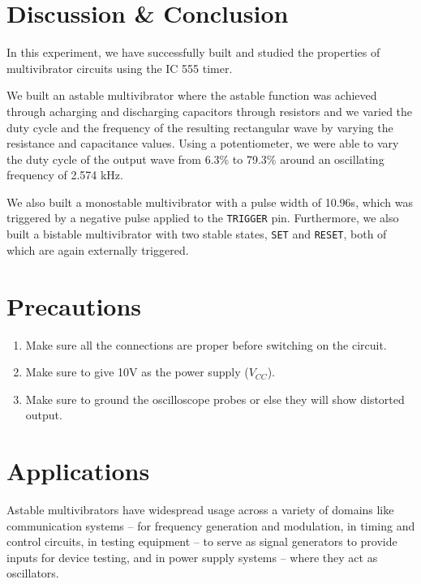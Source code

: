 \section{Discussion \& Conclusion}
In this experiment, we have successfully built and studied the properties of multivibrator circuits using the IC 555 timer.

We built an astable multivibrator where the astable function was achieved through acharging and discharging capacitors through resistors and we varied the duty cycle and the frequency of the resulting rectangular wave by varying the resistance and capacitance values.
Using a potentiometer, we were able to vary the duty cycle of the output wave from 6.3\% to 79.3\% around an oscillating frequency of 2.574 kHz.

We also built a monostable multivibrator with a pulse width of 10.96s, which was triggered by a negative pulse applied to the \verb|TRIGGER| pin. Furthermore, we also built a bistable multivibrator with two stable states, \verb|SET| and \verb|RESET|, both of which are again externally triggered.

\section{Precautions}

\begin{enumerate}
    \item Make sure all the connections are proper before switching on the circuit.
    \item Make sure to give 10V as the power supply ($V_{CC}$).
    \item Make sure to ground the oscilloscope probes or else they will show distorted output.
\end{enumerate}

\section{Applications}
Astable multivibrators have widespread usage across a variety of domains like
communication systems -- for frequency generation and modulation, 
in timing and control circuits, in
testing equipment -- to serve as signal generators to provide inputs for device testing, and in power supply systems -- where they act as oscillators.
